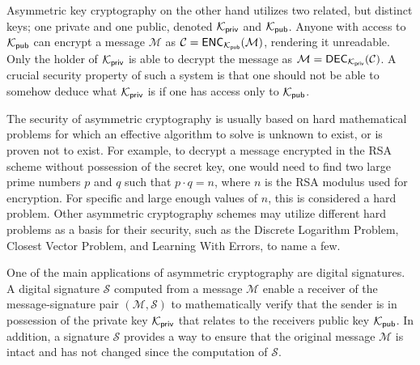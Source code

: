 Asymmetric key cryptography on the other hand utilizes two related, but distinct keys; one private and one public, denoted $\mathcal{K}_{\mathsf{priv}}$ and $\mathcal{K}_{\mathsf{pub}}$.
Anyone with access to $\mathcal{K}_{\mathsf{pub}}$ can encrypt a message $\mathcal{M}$ as $\mathcal{C} = \mathsf{ENC}_{\mathcal{K}_{\mathsf{pub}}}(\mathcal{M})$, rendering it unreadable. Only the holder of $\mathcal{K}_{\mathsf{priv}}$ is able to decrypt the message
as $\mathcal{M} = \mathsf{DEC}_{\mathcal{K}_{\mathsf{priv}}}(\mathcal{C})$. A crucial security property of such a system is that one should not be able to somehow deduce what $\mathcal{K}_{\mathsf{priv}}$ is if one has access only to $\mathcal{K}_{\mathsf{pub}}$.

The security of asymmetric cryptography is usually based on hard mathematical problems for which an effective algorithm to solve is unknown to exist, or is proven not to exist. 
For example, to decrypt a message encrypted in the RSA scheme \cite{RSA78} without possession of the secret key, one would need to find two large prime numbers $p$ and $q$ such that 
$p \cdot q = n$, where $n$ is the RSA modulus used for encryption. For specific and large enough values of $n$, this is considered a hard problem. \cite{ENCYCLOPEDIA}
Other asymmetric cryptography schemes may utilize different hard problems as a basis for their security, such as the Discrete Logarithm Problem, Closest Vector Problem, and Learning With Errors, to name a few.


One of the main applications of asymmetric cryptography are digital signatures. A digital signature $\mathcal{S}$ computed from a message $\mathcal{M}$ enable a receiver of the 
message-signature pair $(\mathcal{M}, \mathcal{S})$ to mathematically verify that the sender is in possession of the private key $\mathcal{K}_{\mathsf{priv}}$ that relates to the receivers public key $\mathcal{K}_{\mathsf{pub}}$.
In addition, a signature $\mathcal{S}$ provides a way to ensure that the original message $\mathcal{M}$ is intact and has not changed since the computation of $\mathcal{S}$.

